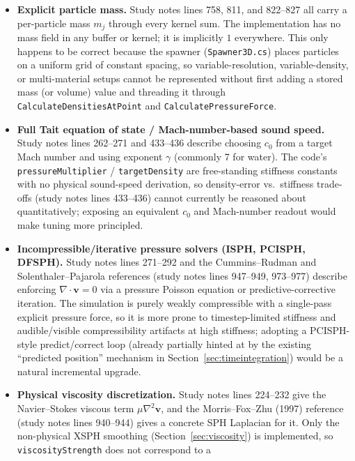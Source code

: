 \documentclass[11pt]{article}
\newcommand{\file}[1]{\texttt{#1}}
\begin{document}
\begin{itemize}
    \item \textbf{Explicit particle mass.} Study notes lines 758, 811, and
    822--827 all carry a per-particle mass $m_j$ through every kernel sum.
    The implementation has no mass field in any buffer or kernel; it is
    implicitly $1$ everywhere. This only happens to be correct because the
    spawner (\file{Spawner3D.cs}) places particles on a uniform grid of
    constant spacing, so variable-resolution, variable-density, or
    multi-material setups cannot be represented without first adding a
    stored mass (or volume) value and threading it through
    \texttt{CalculateDensitiesAtPoint} and \texttt{CalculatePressureForce}.
    \item \textbf{Full Tait equation of state / Mach-number-based sound
    speed.} Study notes lines 262--271 and 433--436 describe choosing $c_0$
    from a target Mach number and using exponent $\gamma$ (commonly 7 for
    water). The code's \texttt{pressureMultiplier} /
    \texttt{targetDensity} are free-standing stiffness constants with no
    physical sound-speed derivation, so density-error vs.\ stiffness
    trade-offs (study notes lines 433--436) cannot currently be reasoned
    about quantitatively; exposing an equivalent $c_0$ and Mach-number
    readout would make tuning more principled.
    \item \textbf{Incompressible/iterative pressure solvers (ISPH, PCISPH,
    DFSPH).} Study notes lines 271--292 and the Cummins--Rudman and
    Solenthaler--Pajarola references (study notes lines 947--949, 973--977)
    describe enforcing $\nabla\cdot\mathbf{v}=0$ via a pressure Poisson
    equation or predictive-corrective iteration. The simulation is purely
    weakly compressible with a single-pass explicit pressure force, so it is
    more prone to timestep-limited stiffness and audible/visible
    compressibility artifacts at high stiffness; adopting a PCISPH-style
    predict/correct loop (already partially hinted at by the existing
    ``predicted position'' mechanism in Section~\ref{sec:timeintegration})
    would be a natural incremental upgrade.
    \item \textbf{Physical viscosity discretization.} Study notes lines
    224--232 give the Navier--Stokes viscous term
    $\mu\nabla^2\mathbf{v}$, and the Morris--Fox--Zhu (1997) reference
    (study notes lines 940--944) gives a concrete SPH Laplacian for it. Only
    the non-physical XSPH smoothing (Section~\ref{sec:viscosity}) is
    implemented, so \texttt{viscosityStrength} does not correspond to a

\end{itemize}
\end{document}
